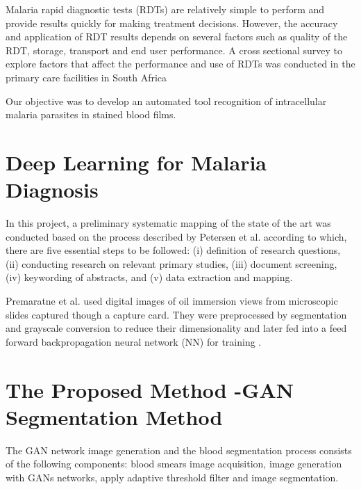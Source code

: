 Malaria rapid diagnostic tests (RDTs) are relatively simple to perform and provide results quickly for making treatment decisions. However, the accuracy and application of RDT
results depends on several factors such as quality of the RDT, storage, transport and end user performance. A cross sectional survey to explore factors that affect the performance and use of
RDTs was conducted in the primary care facilities in South Africa \cite{Moonasar2007}

Our objective was to develop an automated tool recognition of intracellular malaria parasites in stained blood films.    

\section{Deep Learning for Malaria Diagnosis}

In this project, a preliminary systematic mapping of the state of the art was conducted based on the process described by Petersen et al. according to which, there are five essential steps to be followed: (i) definition of research questions, (ii) conducting research on relevant primary studies, (iii) document screening, (iv) keywording of abstracts, and (v) data extraction and mapping.

Premaratne et al. used digital images of oil immersion views from microscopic slides captured though a capture card. They were preprocessed by segmentation and grayscale conversion to reduce their dimensionality and later fed into a feed forward backpropagation neural network (NN) for training \cite{Premaratne2006AFilms}.



\section{The Proposed Method -GAN Segmentation Method}
\label{segmethod}


The GAN network image generation and the blood segmentation process consists of the following components: blood smears image acquisition, image generation with GANs networks,  apply adaptive threshold filter and image segmentation.



